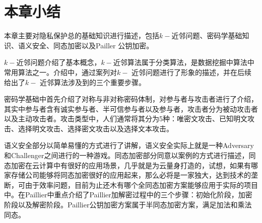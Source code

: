 \section{本章小结}
本章主要对隐私保护总的基础知识进行描述，包括$k-$近邻问题、密码学基础知识、语义安全、同态加密以及Pailler 公钥加密。

$k-$近邻问题介绍了基本概念，$k-$近邻算法属于分类算法，是数据挖掘中算法中常用算法之一。介绍中，通过案列对$k-$ 近邻问题进行了形象的描述，并在后续给出了$k-$ 近邻算法涉及到的三个重要步骤。

密码学基础中首先介绍了对称与非对称密码体制，对参与者与攻击者进行了介绍，其实中参与者含有诚实参与者、半可信参与者以及参与者，攻击者分为被动攻击者以及主动攻击者。攻击类型中，人们通常将其分为5种：唯密文攻击、已知明文攻击、选择明文攻击、选择密文攻击以及选择文本攻击。

语义安全部分以简单易懂的方式进行了讲解，语义安全实际上就是一种Adversary和Challenger之间进行的一种游戏。同态加密部分同意以案例的方式进行描述，同态加密在云计算中有很好的应用场景，几乎就是为云量身打造的，试想，如果有哪家存储公司能够将同态加密很好的应用起来，那么必将是一家独大，达到技术的垄断，可由于效率问题，目前为止还木有哪个全同态加密方案能够应用于实际的项目中。在Paillier中重点介绍了Paillier加解密过程中的三个步骤：初始化阶段，加密阶段以及解密阶段。Paillier公钥加密方案属于半同态加密方案，满足加法和乘法同态。
